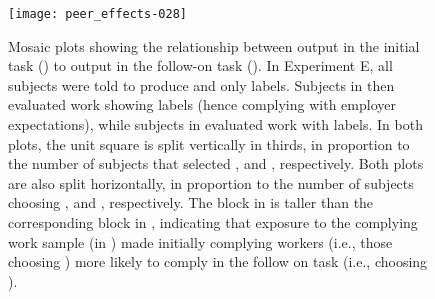 \documentclass[12pt]{article}
\begin{document}
\begin{figure} 
\centering 
\texttt{[image: peer\_effects-028]}
\caption{Mosaic plots showing the relationship between output in the
  initial task () to output in the follow-on task (). In
  Experiment E, all subjects were told to produce  and only 
  labels. Subjects in  then evaluated work showing  labels
  (hence complying with employer expectations), while subjects in
   evaluated work with  labels. In both plots, the unit
  square is split vertically in thirds, in proportion to the number of
  subjects that selected ,  and ,
  respectively. Both plots are also split horizontally, in proportion
  to the number of subjects choosing ,  and ,
  respectively.  The  block in  is taller than
  the corresponding block in , indicating that exposure to the
  complying work sample (in ) made initially complying workers
  (i.e., those choosing ) more likely to comply in the follow
  on task (i.e., choosing ).
  \label{fig:ExpE.trans}}
\end{figure} 
\end{document}
